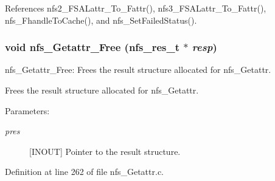References nfs2\_\-FSALattr\_\-To\_\-Fattr(), nfs3\_\-FSALattr\_\-To\_\-Fattr(), nfs\_\-Fhandle\-To\-Cache(), and nfs\_\-Set\-Failed\-Status().
\subsubsection{\setlength{\rightskip}{0pt plus 5cm}void nfs\_\-Getattr\_\-Free (nfs\_\-res\_\-t $\ast$ {\em resp})}\label{nfs__Getattr_8c_a1}


nfs\_\-Getattr\_\-Free: Frees the result structure allocated for nfs\_\-Getattr.

Frees the result structure allocated for nfs\_\-Getattr.

\begin{Desc}
\item[Parameters:]
\begin{description}
\item[{\em pres}][INOUT] Pointer to the result structure. \end{description}
\end{Desc}


Definition at line 262 of file nfs\_\-Getattr.c.